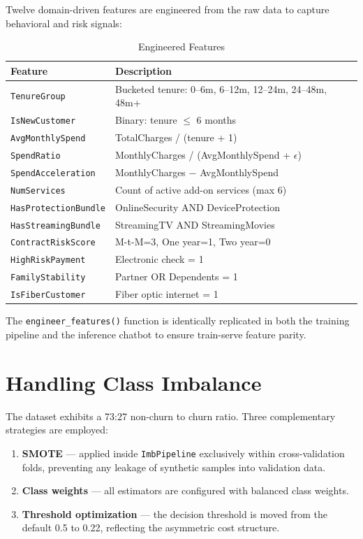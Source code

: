 \documentclass[conference]{IEEEtran}
\begin{document}
Twelve domain-driven features are engineered from the raw data to capture behavioral and risk signals:

\begin{table}[h]
\centering
\caption{Engineered Features}
\begin{tabular}{p{2.8cm}p{4.8cm}}
\toprule
\textbf{Feature} & \textbf{Description} \\
\midrule
\texttt{TenureGroup} & Bucketed tenure: 0--6m, 6--12m, 12--24m, 24--48m, 48m+ \\
\texttt{IsNewCustomer} & Binary: tenure $\leq$ 6 months \\
\texttt{AvgMonthlySpend} & TotalCharges / (tenure + 1) \\
\texttt{SpendRatio} & MonthlyCharges / (AvgMonthlySpend + $\epsilon$) \\
\texttt{SpendAcceleration} & MonthlyCharges $-$ AvgMonthlySpend \\
\texttt{NumServices} & Count of active add-on services (max 6) \\
\texttt{HasProtectionBundle} & OnlineSecurity AND DeviceProtection \\
\texttt{HasStreamingBundle} & StreamingTV AND StreamingMovies \\
\texttt{ContractRiskScore} & M-t-M=3, One year=1, Two year=0 \\
\texttt{HighRiskPayment} & Electronic check = 1 \\
\texttt{FamilyStability} & Partner OR Dependents = 1 \\
\texttt{IsFiberCustomer} & Fiber optic internet = 1 \\
\bottomrule
\end{tabular}
\end{table}

The \texttt{engineer\_features()} function is identically replicated in both the training pipeline and the inference chatbot to ensure train-serve feature parity.

\section{Handling Class Imbalance}

The dataset exhibits a 73:27 non-churn to churn ratio. Three complementary strategies are employed:

\begin{enumerate}
    \item \textbf{SMOTE} \cite{chawla2002} --- applied inside \texttt{ImbPipeline} exclusively within cross-validation folds, preventing any leakage of synthetic samples into validation data.
    \item \textbf{Class weights} --- all estimators are configured with balanced class weights.
    \item \textbf{Threshold optimization} --- the decision threshold is moved from the default 0.5 to 0.22, reflecting the asymmetric cost structure.
\end{enumerate}
\end{document}
